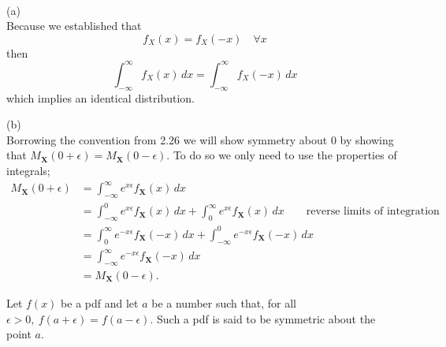 \documentclass[12pt,letterpaper]{exam}
\begin{document}
\begin{questions}
	\begin{solution}\\
		(a) \\
		Because we established that
		\[f_X(x) = f_X(-x)\quad \forall x\]
		then
		\[ \int_{-\infty}^{\infty} f_X(x) \,dx = \int_{-\infty}^{\infty} f_X(-x) \,dx \]
		which implies an identical distribution.
		
		(b) \\
		Borrowing the convention from 2.26 we will show symmetry about 0 by showing that \(M_\mathbf{X}(0+\epsilon)=M_\mathbf{X}(0-\epsilon)\).
		To do so we only need to use the properties of integrals;
		\begin{align*}
			M_\mathbf{X}(0+\epsilon)
			&= \int_{-\infty}^{\infty} e^{x\epsilon} f_\mathbf{X}(x) \,dx \\
			&= \int_{-\infty}^{0} e^{x\epsilon} f_\mathbf{X}(x) \,dx + \int_{0}^{\infty} e^{x\epsilon} f_\mathbf{X}(x) \,dx \qquad\text{reverse limits of integration}\\
			&= \int_{0}^{\infty} e^{-x\epsilon} f_\mathbf{X}(-x) \,dx + \int_{-\infty}^{0} e^{-x\epsilon} f_\mathbf{X}(-x) \,dx  \\
			&= \int_{-\infty}^{\infty} e^{-x\epsilon} f_\mathbf{X}(-x) \,dx \\
			&= M_\mathbf{X}(0-\epsilon).
		\end{align*}
		
	\end{solution}
	
	\question  Let $f(x)$ be a pdf and let $a$ be a number such that, for all $\epsilon > 0, \ f(a+\epsilon) = f(a-\epsilon)$. Such a pdf is said to be symmetric about the point $a$.
	
\end{questions}
\end{document}
